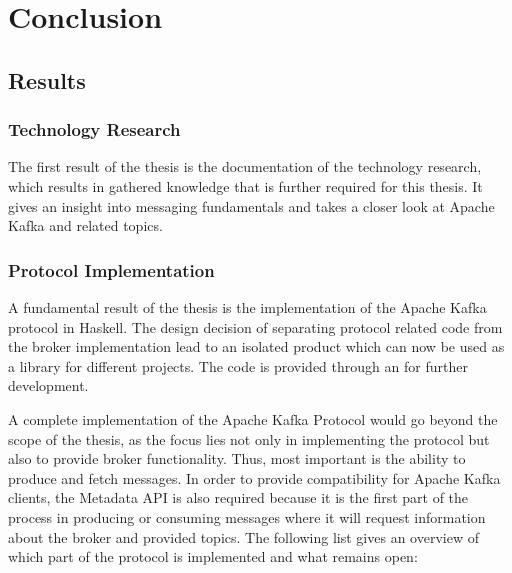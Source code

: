 \chapter{Conclusion}
\label{chap:conclusion}

\section{Results}
\label{sec:conc-results}
\subsection{Technology Research}
The first result of the thesis is the documentation of the technology research,
which results in gathered knowledge that is further required for this
thesis. It gives an insight into messaging fundamentals and takes a closer look
at Apache Kafka and related topics.

\subsection{Protocol Implementation}

A fundamental result of the thesis is the implementation of the Apache Kafka
protocol in Haskell. The design decision of separating protocol related code
from the broker implementation lead to an isolated product which can now be used
as a library for different projects. The code is provided through an  for further development.

A complete implementation of the Apache Kafka Protocol would go beyond the scope
of the thesis, as the focus lies not only in implementing the protocol but also
to provide broker functionality. Thus, most important is the ability to produce
and fetch messages. In order to provide compatibility for Apache Kafka clients,
the Metadata API is also required because it is the first part of the
process in producing or consuming messages where it will request information
about the broker and provided topics. The following list gives an overview of
which part of the protocol is implemented and what remains open:

